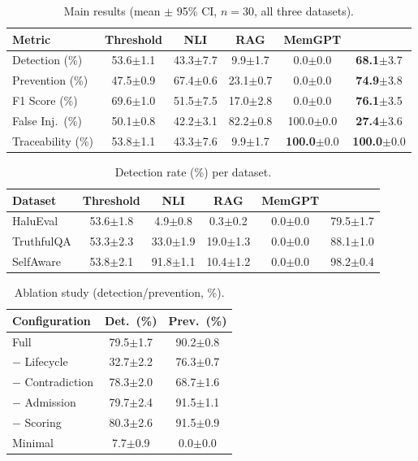 
\begin{table}[t]
\centering
\caption{Main results (mean $\pm$ 95\% CI, $n=30$, all three datasets).}
\label{tab:main}
\small
\begin{tabular}{@{}lccccc@{}}
\toprule
Metric & Threshold & NLI & RAG & MemGPT & \cocortex{} \\
\midrule
Detection (\%) & 53.6$\pm$1.1 & 43.3$\pm$7.7 & 9.9$\pm$1.7 & 0.0$\pm$0.0 & \textbf{68.1}$\pm$3.7 \\
Prevention (\%) & 47.5$\pm$0.9 & 67.4$\pm$0.6 & 23.1$\pm$0.7 & 0.0$\pm$0.0 & \textbf{74.9}$\pm$3.8 \\
F1 Score (\%) & 69.6$\pm$1.0 & 51.5$\pm$7.5 & 17.0$\pm$2.8 & 0.0$\pm$0.0 & \textbf{76.1}$\pm$3.5 \\
False Inj.\ (\%) & 50.1$\pm$0.8 & 42.2$\pm$3.1 & 82.2$\pm$0.8 & 100.0$\pm$0.0 & \textbf{27.4}$\pm$3.6 \\
Traceability (\%) & 53.8$\pm$1.1 & 43.3$\pm$7.6 & 9.9$\pm$1.7 & \textbf{100.0}$\pm$0.0 & \textbf{100.0}$\pm$0.0 \\
\bottomrule
\end{tabular}
\end{table}

\begin{table}[t]
\centering
\caption{Detection rate (\%) per dataset.}
\label{tab:per_dataset}
\small
\begin{tabular}{@{}lccccc@{}}
\toprule
Dataset & Threshold & NLI & RAG & MemGPT & \cocortex{} \\
\midrule
HaluEval & 53.6$\pm$1.8 & 4.9$\pm$0.8 & 0.3$\pm$0.2 & 0.0$\pm$0.0 & 79.5$\pm$1.7 \\
TruthfulQA & 53.3$\pm$2.3 & 33.0$\pm$1.9 & 19.0$\pm$1.3 & 0.0$\pm$0.0 & 88.1$\pm$1.0 \\
SelfAware & 53.8$\pm$2.1 & 91.8$\pm$1.1 & 10.4$\pm$1.2 & 0.0$\pm$0.0 & 98.2$\pm$0.4 \\
\bottomrule
\end{tabular}
\end{table}

\begin{table}[t]
\centering
\caption{Ablation study (detection/prevention, \%).}
\label{tab:ablation}
\small
\begin{tabular}{@{}lcc@{}}
\toprule
Configuration & Det.\ (\%) & Prev.\ (\%) \\
\midrule
Full \cocortex{} & 79.5$\pm$1.7 & 90.2$\pm$0.8 \\
$-$ Lifecycle & 32.7$\pm$2.2 & 76.3$\pm$0.7 \\
$-$ Contradiction & 78.3$\pm$2.0 & 68.7$\pm$1.6 \\
$-$ Admission & 79.7$\pm$2.4 & 91.5$\pm$1.1 \\
$-$ Scoring & 80.3$\pm$2.6 & 91.5$\pm$0.9 \\
Minimal & 7.7$\pm$0.9 & 0.0$\pm$0.0 \\
\bottomrule
\end{tabular}
\end{table}
